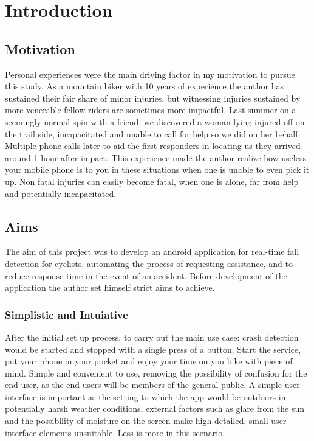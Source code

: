 \chapter{Introduction}

\section{Motivation }

Personal experiences were the main driving factor in my motivation to pursue this study. As a mountain biker with 10 years of experience the author has sustained their fair share of minor injuries, but witnessing injuries sustained by more venerable fellow riders are sometimes more impactful. Last summer on a seemingly normal spin with a friend, we discovered a woman lying injured off on the trail side, incapacitated and unable to call for help so we did on her behalf. Multiple phone calls later to aid the first responders in locating us they arrived - around 1 hour after impact.  This experience made the author realize how useless your mobile phone is to you in these situations when one is unable to even pick it up. Non fatal injuries can easily become fatal, when one is alone, far from help and potentially incapacitated.





\section{Aims}


The  aim of this project was to develop an android application for real-time fall detection for cyclists,  automating the process of requesting assistance, and to reduce response time in the event of an accident. Before development of the application the author set himself strict aims to achieve. 

\subsection*{Simplistic and Intuiative}

After the initial set up process, to carry out the main use case: crash detection would be started and stopped with a single press of a button. Start the service, put your phone in your pocket and enjoy your time on you bike with piece of mind. Simple and convenient to use, removing the possibility of confusion for the end user, as the end users will be members of  the general public.
A simple user interface is important as the setting to which the app would be outdoors in potentially harsh weather conditions, external factors such as glare from the sun  and the possibility of moisture on the screen make high detailed, small user interface elements unsuitable. Less is more in this scenario.


